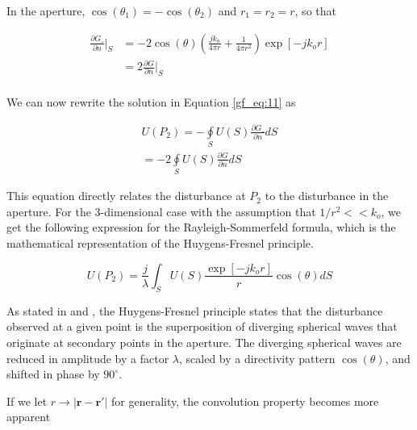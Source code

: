 \noindent In the aperture, $\cos(\theta_1) = -\cos(\theta_2)$ and $r_1=r_2=r$, so that

\begin{equation}
\begin{aligned}
\frac{\partial G\_}{\partial n}\bigg|_S &= -2\cos(\theta)\left(\frac{jk_o}{4\pi r} + \frac{1}{4\pi r^2}\right)\exp[-jk_or]\\
&=2\frac{\partial G}{\partial n}\bigg|_S \\
\end{aligned}
\label{gf_eq:51}
\end{equation}
\renewcommand{\baselinestretch}{2} \small\normalsize

\noindent We can now rewrite the solution in Equation \ref{gf_eq:11} as

\begin{equation}
\begin{gathered}
U(P_2) = -\oint\limits_{S}U(S)\frac{\partial G\_}{\partial n}dS\\
= -2\oint\limits_{S}U(S)\frac{\partial G}{\partial n}dS
\end{gathered}
\label{gf_eq:52}
\end{equation}
\renewcommand{\baselinestretch}{2} \small\normalsize

This equation directly relates the disturbance at $P_2$ to the disturbance in the aperture. For the 3-dimensional case with the assumption that $1/r^2 << k_o$, we get the following expression for the Rayleigh-Sommerfeld formula, which is the mathematical representation of the Huygens-Fresnel principle.

\begin{equation}
\boxed{U(P_2) =\frac{j}{\lambda}\int_S U(S)\frac{\exp\left[-jk_o r\right]}{r}\cos(\theta)dS}
\label{gf_eq:53}
\end{equation}
\renewcommand{\baselinestretch}{2} \small\normalsize

As stated in \cite{goodman_fourier} and \cite{gaskill_fourier}, the Huygens-Fresnel principle states that the disturbance observed at a given point is the superposition of diverging spherical waves that originate at secondary points in the aperture. The diverging spherical waves are reduced in amplitude by a factor $\lambda$, scaled by a directivity pattern $\cos(\theta)$, and shifted in phase by $90^{\circ}$.

\noindent If we let $r \rightarrow |\mathbf{r}-\mathbf{r}'|$ for generality, the convolution property becomes more apparent

